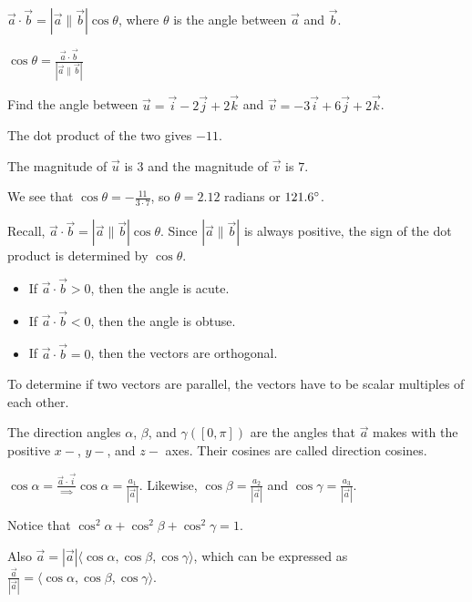 \documentclass[../calc3.tex]{subfiles}
\begin{document}
\begin{theorem}
    $\vec{a}\cdot \vec{b}=|\vec{a}\|\vec{b}|\cos\theta$, where $\theta$ is the angle between $\vec{a}$ and $\vec{b}$.
\end{theorem}
\begin{corollary}
    $\cos\theta = \frac{\vec{a}\cdot \vec{b}}{|\vec{a}\|\vec{b}|}$
\end{corollary}

\begin{example}
    Find the angle between $\vec{u}=\vec{i}-2\vec{j}+2\vec{k}$ and $\vec{v}=-3\vec{i}+6\vec{j}+2\vec{k}$.

    The dot product of the two gives $-11$.

    The magnitude of $\vec{u}$ is $3$ and the magnitude of $\vec{v}$ is $7$.

    We see that $\cos\theta = -\frac{11}{3\cdot 7}$, so $\theta = 2.12$ radians or $121.6\degree$.
\end{example}

Recall, $\vec{a}\cdot \vec{b}=|\vec{a}\|\vec{b}|\cos\theta$. Since $|\vec{a}\|\vec{b}|$ is always positive, the sign of the dot product is determined by $\cos\theta$.
\begin{itemize}
    \item If $\vec{a}\cdot \vec{b}>0$, then the angle is acute.
    \item If $\vec{a}\cdot \vec{b}<0$, then the angle is obtuse.
    \item If $\vec{a}\cdot \vec{b}=0$, then the vectors are orthogonal.
\end{itemize}

To determine if two vectors are parallel, the vectors have to be scalar multiples of each other.

\begin{definition}
    The direction angles $\alpha$, $\beta$, and $\gamma ([0,\pi])$ are the angles that $\vec{a}$ makes with the positive $x-$, $y-$, and $z-$ axes. Their cosines are called direction cosines.
\end{definition}
$\cos\alpha = \frac{\vec{a}\cdot \vec{i}} \implies \cos\alpha = \frac{a_1}{|\vec{a}|}$. Likewise, $\cos\beta = \frac{a_2}{|\vec{a}|}$ and $\cos\gamma = \frac{a_3}{|\vec{a}|}$.

Notice that $\cos^2\alpha + \cos^2\beta + \cos^2\gamma = 1$.

Also $\vec{a}=|\vec{a}|\langle \cos \alpha, \cos\beta, \cos\gamma \rangle$, which can be expressed as $\frac{\vec{a}}{|\vec{a}|}=\langle \cos\alpha, \cos\beta, \cos\gamma\rangle$.
\end{document}
